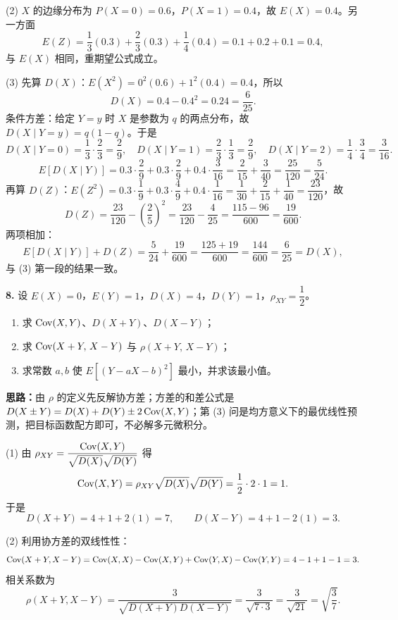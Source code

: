 (2) $X$ 的边缘分布为 $P(X=0)=0.6$，$P(X=1)=0.4$，故 $E(X)=0.4$。另一方面
\[
E(Z)=\frac13(0.3)+\frac23(0.3)+\frac14(0.4)=0.1+0.2+0.1=0.4,
\]
与 $E(X)$ 相同，重期望公式成立。

(3) 先算 $D(X)$：$E(X^2)=0^2(0.6)+1^2(0.4)=0.4$，所以
\[
D(X)=0.4-0.4^2=0.24=\frac{6}{25}.
\]
条件方差：给定 $Y=y$ 时 $X$ 是参数为 $q$ 的两点分布，故 $D(X\mid Y=y)=q(1-q)$。于是
\[
D(X\mid Y=0)=\frac13\cdot\frac23=\frac29,\quad
D(X\mid Y=1)=\frac23\cdot\frac13=\frac29,\quad
D(X\mid Y=2)=\frac14\cdot\frac34=\frac3{16}.
\]
\[
E[D(X\mid Y)]=0.3\cdot\frac29+0.3\cdot\frac29+0.4\cdot\frac3{16}
=\frac{2}{15}+\frac{3}{40}=\frac{25}{120}=\frac5{24}.
\]
再算 $D(Z)$：$E(Z^2)=0.3\cdot\dfrac19+0.3\cdot\dfrac49+0.4\cdot\dfrac1{16}
=\dfrac1{30}+\dfrac2{15}+\dfrac1{40}=\dfrac{23}{120}$，故
\[
D(Z)=\frac{23}{120}-\left(\frac25\right)^2=\frac{23}{120}-\frac{4}{25}=\frac{115-96}{600}=\frac{19}{600}.
\]
两项相加：
\[
E[D(X\mid Y)]+D(Z)=\frac5{24}+\frac{19}{600}=\frac{125+19}{600}=\frac{144}{600}=\frac6{25}=D(X),
\]
与 (3) 第一段的结果一致。


\else \answerarea[10] \fi

\textbf{8.} 设 $E(X)=0$，$E(Y)=1$，$D(X)=4$，$D(Y)=1$，$\rho_{XY}=\dfrac12$。
\begin{enumerate}[label=(\arabic*)]
    \item 求 $\operatorname{Cov}(X,Y)$、$D(X+Y)$、$D(X-Y)$；
    \item 求 $\operatorname{Cov}(X+Y,\,X-Y)$ 与 $\rho(X+Y,\,X-Y)$；
    \item 求常数 $a,b$ 使 $E[(Y-aX-b)^2]$ 最小，并求该最小值。
\end{enumerate}

\ifshowsolutions%
\textbf{思路：}由 $\rho$ 的定义先反解协方差；方差的和差公式是 $D(X\pm Y)=D(X)+D(Y)\pm2\operatorname{Cov}(X,Y)$；第 (3) 问是均方意义下的最优线性预测，把目标函数配方即可，不必解多元微积分。

(1) 由 $\rho_{XY}=\dfrac{\operatorname{Cov}(X,Y)}{\sqrt{D(X)}\sqrt{D(Y)}}$ 得
\[
\operatorname{Cov}(X,Y)=\rho_{XY}\sqrt{D(X)}\sqrt{D(Y)}=\frac12\cdot2\cdot1=1.
\]
于是
\[
D(X+Y)=4+1+2(1)=7,\qquad D(X-Y)=4+1-2(1)=3.
\]

(2) 利用协方差的双线性性：
\[
\operatorname{Cov}(X+Y,X-Y)=\operatorname{Cov}(X,X)-\operatorname{Cov}(X,Y)+\operatorname{Cov}(Y,X)-\operatorname{Cov}(Y,Y)
=4-1+1-1=3.
\]
相关系数为
\[
\rho(X+Y,X-Y)=\frac{3}{\sqrt{D(X+Y)D(X-Y)}}=\frac{3}{\sqrt{7\cdot3}}=\frac{3}{\sqrt{21}}=\sqrt{\frac37}.
\]

